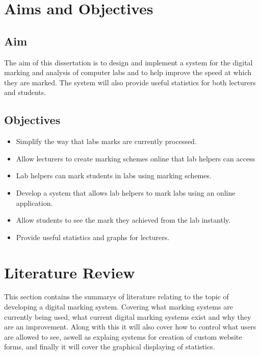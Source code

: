 \documentclass[12pt]{article}  %
\begin{document}
\newpage
\section{Aims and Objectives}
\subsection{Aim}
The aim of this dissertation is to design and implement a system for the digital marking and analysis of computer labs and to help improve the speed at which they are marked. The system will also provide useful statistics for both lecturers and students.

\subsection{Objectives}
\begin{itemize}
\item Simplify the way that labs marks are currently processed.
\item Allow lecturers to create marking schemes online that lab helpers can access
\item Lab helpers can mark students in labs using marking schemes.
\item Develop a system that allows lab helpers to mark labs using an online application.
\item Allow students to see the mark they achieved from the lab instantly.
\item Provide useful statistics and graphs for lecturers.
\end{itemize}








\newpage
\section{Literature Review}
This section contains the summarys of literature relating to the topic of developing a digital marking system. Covering what marking systems are currently being used, what current digital marking systems exist and why they are an improvement. Along with this it will also cover how to control what users are allowed to see, aswell as explaing systems for creation of custom website forms, and finally it will cover the graphical displaying of statistics.
\end{document}
